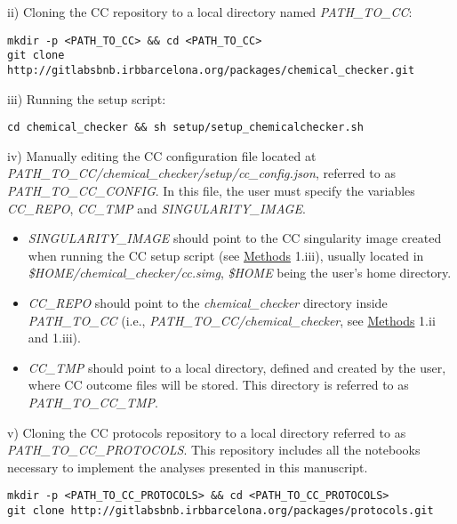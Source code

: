 ii) Cloning the CC repository to a local directory named \textit{PATH\_TO\_CC}: \\

\begin{lstlisting}
mkdir -p <PATH_TO_CC> && cd <PATH_TO_CC>
git clone http://gitlabsbnb.irbbarcelona.org/packages/chemical_checker.git
\end{lstlisting}

iii) Running the setup script:  \\

\begin{lstlisting}
cd chemical_checker && sh setup/setup_chemicalchecker.sh
\end{lstlisting}

iv) Manually editing the CC configuration file located at \textit{PATH\_TO\_CC/chemical\_checker/setup/cc\_config.json}, referred to as \textit{PATH\_TO\_CC\_CONFIG}. In this file, the user must specify the variables \textit{CC\_REPO}, \textit{CC\_TMP} and \textit{SINGULARITY\_IMAGE}.
\begin{itemize}
    \item \textit{SINGULARITY\_IMAGE} should point to the CC singularity image created when running the CC setup script (see \hyperref[Protocols_Methods]{Methods} 1.iii), usually located in \textit{\$HOME/chemical\_checker/cc.simg}, \textit{\$HOME} being the user’s home directory.
    \item \textit{CC\_REPO} should point to the \textit{chemical\_checker} directory inside \textit{PATH\_TO\_CC} (i.e., \textit{PATH\_TO\_CC/chemical\_checker}, see \hyperref[Protocols_Methods]{Methods} 1.ii and 1.iii).
    \item \textit{CC\_TMP} should point to a local directory, defined and created by the user, where CC outcome files will be stored. This directory is referred to as \textit{PATH\_TO\_CC\_TMP}.
\end{itemize}

v) Cloning the CC protocols repository to a local directory referred to as \textit{PATH\_TO\_CC\_PROTOCOLS}. This repository includes all the notebooks necessary to implement the analyses presented in this manuscript. \\

\begin{lstlisting}
mkdir -p <PATH_TO_CC_PROTOCOLS> && cd <PATH_TO_CC_PROTOCOLS>
git clone http://gitlabsbnb.irbbarcelona.org/packages/protocols.git
\end{lstlisting}

